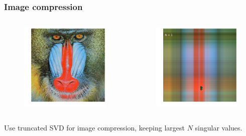 \documentclass[xcolor={dvipsnames}]{beamer}
\begin{document}
\begin{frame}
\frametitle{Image compression}
\begin{columns}
\hspace{-0.25in}
\begin{figure}
\includegraphics[width=\textwidth]{figs/mandrill.png}
\end{figure}
\begin{figure}
\includegraphics[width=\textwidth]{figs/mandrill-1.png}
\end{figure}
\end{columns}
Use truncated SVD for image compression, keeping largest $N$ singular values.
\end{frame}
\end{document}
